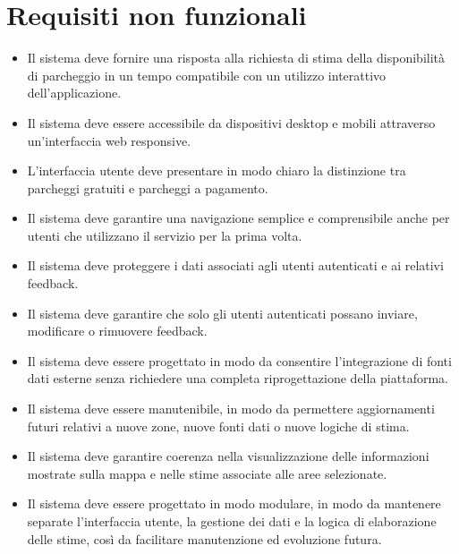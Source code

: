 \documentclass[a4paper,12pt]{article}
\begin{document}
\section{Requisiti non funzionali}

\begin{itemize}[leftmargin=2cm]
    \item[\textbf{RNF1:}] Il sistema deve fornire una risposta alla richiesta di stima della disponibilità di parcheggio in un tempo compatibile con un utilizzo interattivo dell'applicazione.
    
    \item[\textbf{RNF2:}] Il sistema deve essere accessibile da dispositivi desktop e mobili attraverso un'interfaccia web responsive.
    
    \item[\textbf{RNF3:}] L'interfaccia utente deve presentare in modo chiaro la distinzione tra parcheggi gratuiti e parcheggi a pagamento.
    
    \item[\textbf{RNF4:}] Il sistema deve garantire una navigazione semplice e comprensibile anche per utenti che utilizzano il servizio per la prima volta.
    
    \item[\textbf{RNF5:}] Il sistema deve proteggere i dati associati agli utenti autenticati e ai relativi feedback.
    
    \item[\textbf{RNF6:}] Il sistema deve garantire che solo gli utenti autenticati possano inviare, modificare o rimuovere feedback.
    
    \item[\textbf{RNF7:}] Il sistema deve essere progettato in modo da consentire l'integrazione di fonti dati esterne senza richiedere una completa riprogettazione della piattaforma.
    
    \item[\textbf{RNF8:}] Il sistema deve essere manutenibile, in modo da permettere aggiornamenti futuri relativi a nuove zone, nuove fonti dati o nuove logiche di stima.
    
    \item[\textbf{RNF9:}] Il sistema deve garantire coerenza nella visualizzazione delle informazioni mostrate sulla mappa e nelle stime associate alle aree selezionate.
    
    \item[\textbf{RNF10:}] Il sistema deve essere progettato in modo modulare, in modo da mantenere separate l'interfaccia utente, la gestione dei dati e la logica di elaborazione delle stime, così da facilitare manutenzione ed evoluzione futura.
\end{itemize}
\end{document}
